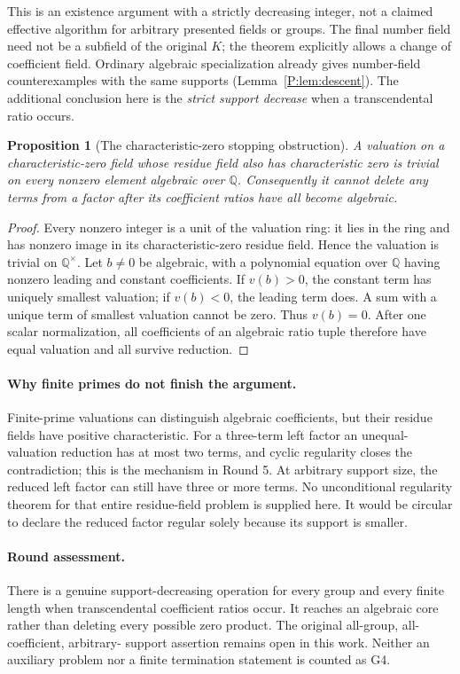 \documentclass[11pt,a4paper,oneside]{report}
\newtheorem{proposition}[theorem]{Proposition}
\theoremstyle{definition}
\theoremstyle{remark}
\newcommand{\Q}{\mathbb Q}
\begin{document}
This is an existence argument with a strictly decreasing integer,
not a claimed effective algorithm for arbitrary presented fields or
groups. The final number field need not be a subfield of the original
$K$; the theorem explicitly allows a change of coefficient field.
Ordinary algebraic specialization already gives number-field
counterexamples with the same supports
(Lemma~\ref{P:lem:descent}). The additional conclusion here is the
\emph{strict support decrease} when a transcendental ratio occurs.

\begin{proposition}[The characteristic-zero stopping obstruction]
\label{M12:r10:stop}
A valuation on a characteristic-zero field whose residue field also
has characteristic zero is trivial on every nonzero element
algebraic over $\Q$. Consequently it cannot delete any terms from
a factor after its coefficient ratios have all become algebraic.
\end{proposition}
\begin{proof}
Every nonzero integer is a unit of the valuation ring: it lies in
the ring and has nonzero image in its characteristic-zero residue
field. Hence the valuation is trivial on $\Q^\times$.
Let $b\ne0$ be algebraic, with a polynomial equation over $\Q$
having nonzero leading and constant coefficients.
If $v(b)>0$, the constant term has uniquely smallest valuation;
if $v(b)<0$, the leading term does. A sum with a unique term of
smallest valuation cannot be zero. Thus $v(b)=0$.
After one scalar normalization, all coefficients of an algebraic
ratio tuple therefore have equal valuation and all survive reduction.
\end{proof}

\paragraph{Why finite primes do not finish the argument.}
Finite-prime valuations can distinguish algebraic coefficients,
but their residue fields have positive characteristic. For a
three-term left factor an unequal-valuation reduction has at most
two terms, and cyclic regularity closes the contradiction; this is
the mechanism in Round 5. At arbitrary support size, the reduced
left factor can still have three or more terms. No unconditional
regularity theorem for that entire residue-field problem is supplied
here. It would be circular to declare the reduced factor regular
solely because its support is smaller.

\paragraph{Round assessment.}
There is a genuine support-decreasing operation for every group and
every finite length when transcendental coefficient ratios occur.
It reaches an algebraic core rather than deleting every possible
zero product. The original all-group, all-coefficient, arbitrary-
support assertion remains open in this work. Neither an auxiliary
problem nor a finite termination statement is counted as G4.
\end{document}
